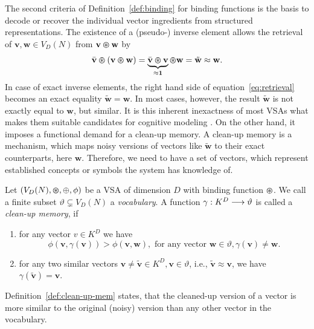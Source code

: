 The second criteria of Definition~\ref{def:binding} for binding functions is the basis to decode or recover the individual vector ingredients from structured representations.
The existence of a (pseudo-) inverse element allows the retrieval of $ \mathbf{v}, \mathbf{w} \in V_{D}(N)$ from $ \mathbf{v} \varoast \mathbf{w}$ by
\begin{equation}
\label{eq:retrieval}
\bar{\mathbf{v}} \varoast \left(\mathbf{v} \varoast \mathbf{w}\right) = \underbrace{\bar{\mathbf{v}} \varoast \mathbf{v}}_{\approx \mathbf{1}} \varoast \mathbf{w} = \tilde{\mathbf{w}} \approx \mathbf{w}.
\end{equation}
In case of exact inverse elements, the right hand side of equation~\eqref{eq:retrieval} becomes an exact equality $\tilde{\mathbf{w}}= \mathbf{w}$.
In most cases, however, the result $\tilde{\mathbf{w}}$ is not exactly equal to $ \mathbf{w}$, but similar.
It is this inherent inexactness of most \acp{VSA} what makes them suitable candidates for cognitive modeling \parencite{Eliasmith2013}.
On the other hand, it imposes a functional demand for a clean-up memory.
A clean-up memory is a mechanism, which maps noisy versions of vectors like $\tilde{\mathbf{w}}$ to their exact counterparts, here $ \mathbf{w}$.
Therefore, we need to have a set of vectors, which represent established concepts or symbols the system has knowledge of.

\begin{defn}
	\label{def:clean-up-mem}
	Let $(V_{D}(N), \varoast, \oplus, \phi)$ be a \acrfull{VSA} of dimension $D$ with binding function $\varoast$.
	We call a finite subset $\vartheta \subsetneq V_{D}(N)$ a \emph{vocabulary}.
	A function $\gamma: K^{D} \longrightarrow \vartheta$ is called a \emph{clean-up memory}, if
	\begin{enumerate}
		\item for any vector $v\in K^{D}$ we have
		\[
		\phi\left( \mathbf{v}, \gamma(\mathbf{v})\right) > \phi\left( \mathbf{v}, \mathbf{w}\right), \textrm{ for any vector } \mathbf{w} \in \vartheta, \gamma( \mathbf{v}) \neq \mathbf{w}.
		\]
		\item for any two similar vectors $ \mathbf{v} \neq \tilde{\mathbf{v}} \in K^{D}, \mathbf{v} \in \vartheta$, i.e., $\tilde{\mathbf{v}} \approx \mathbf{v}$, we have $\gamma(\tilde{\mathbf{v}})= \mathbf{v}$.
	\end{enumerate}
\end{defn}
Definition~\ref{def:clean-up-mem} states, that the cleaned-up version of a vector is more similar to the original (noisy) version than any other vector in the vocabulary.

